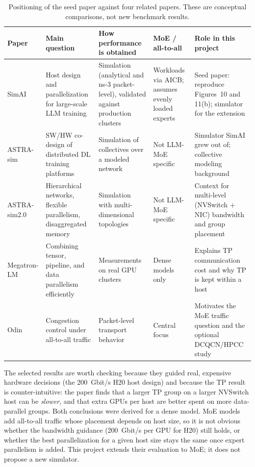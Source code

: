 \documentclass[letterpaper,twocolumn,10pt]{article}
\begin{document}
\begin{table}[t]
\centering
\footnotesize
\setlength{\tabcolsep}{4pt}
\renewcommand{\arraystretch}{1.15}
\begin{tabularx}{\textwidth}{@{}>{\raggedright\arraybackslash}p{}LL>{\raggedright\arraybackslash}p{0.17\textwidth}L@{}}
\toprule
Paper & Main question & How performance is obtained & MoE / all-to-all & Role in this project \\
\midrule
SimAI~\cite{simai} & Host design and parallelization for large-scale LLM training & Simulation (analytical and ns-3 packet-level), validated against production clusters & Workloads via AICB; assumes evenly loaded experts & Seed paper: reproduce Figures~10 and 11(b); simulator for the extension \\
ASTRA-sim~\cite{astra} & SW/HW co-design of distributed DL training platforms & Simulation of collectives over a modeled network & Not LLM-MoE specific & Simulator SimAI grew out of; collective modeling background \\
ASTRA-sim2.0~\cite{astra2} & Hierarchical networks, flexible parallelism, disaggregated memory & Simulation with multi-dimensional topologies & Not LLM-MoE specific & Context for multi-level (NVSwitch + NIC) bandwidth and group placement \\
Megatron-LM~\cite{megatron} & Combining tensor, pipeline, and data parallelism efficiently & Measurements on real GPU clusters & Dense models only & Explains TP communication cost and why TP is kept within a host \\
Odin~\cite{odin} & Congestion control under all-to-all traffic & Packet-level transport behavior & Central focus & Motivates the MoE traffic question and the optional DCQCN/HPCC study \\
\bottomrule
\end{tabularx}
\caption{Positioning of the seed paper against four related papers. These are conceptual comparisons, not new benchmark results.}
\label{tab:position}
\end{table}

The selected results are worth checking because they guided real, expensive hardware decisions (the 200~Gbit/s H20 host design) and because the TP result is counter-intuitive: the paper finds that a larger TP group on a larger NVSwitch host can be \emph{slower}, and that extra GPUs per host are better spent on more data-parallel groups. Both conclusions were derived for a dense model. MoE models add all-to-all traffic whose placement depends on host size, so it is not obvious whether the bandwidth guidance (200~Gbit/s per GPU for H20) still holds, or whether the best parallelization for a given host size stays the same once expert parallelism is added. This project extends their evaluation to MoE; it does not propose a new simulator.
\end{document}
